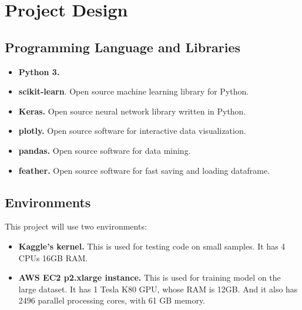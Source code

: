 \documentclass{article}
\begin{document}
\section{Project Design}
\label{sec:project-design}

\subsection{Programming Language and Libraries}

\begin{itemize}

    \item \textbf{Python 3.}

    \item \textbf{scikit-learn}. Open source machine learning library for Python.

    \item \textbf{Keras.} Open source neural network library written in Python. 

    \item \textbf{plotly.} Open source software for interactive data visualization.

    \item \textbf{pandas.} Open source software for data mining. 

    \item \textbf{feather.} Open source software for fast saving and loading dataframe. 

\end{itemize}

\subsection{Environments}

This project will use two environments:

\begin{itemize}

    \item \textbf{Kaggle's kernel.} This is used for testing code on small samples. It has 4 CPUs 16GB RAM.   

    \item \textbf{AWS EC2 p2.xlarge instance.} This is used for training model on the large dataset. It has 1 Tesla K80 GPU, whose RAM is 12GB. And it also has 2496 parallel processing cores, with 61 GB memory. 

\end{itemize}
\end{document}
